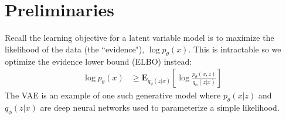 \section{Preliminaries}
\label{sec:background}

Recall the learning objective for a latent variable model is to maximize the likelihood of the data (the ``evidence"), $\log p_\theta(x)$. This is intractable so we optimize the evidence lower bound (ELBO) instead:
\begin{align}
    \log p_\theta(x) & \geq \mathbf{E}_{q_\phi(z|x)}[\log \frac{p_\theta(x,z)}{q_\phi(z|x)}]\label{eqn:elbo}
\end{align}
The VAE \cite{kingma2013auto,rezende2014stochastic} is an example of one such generative model where $p_\theta(x|z)$ and $q_\phi(z|x)$ are deep neural networks used to parameterize a simple likelihood.

